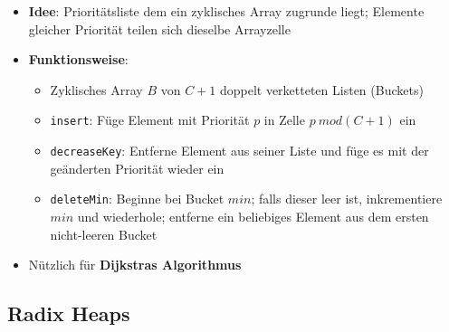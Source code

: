 \documentclass[10pt,a4paper]{article}
\begin{document}
  	\begin{itemize}
  		\item \textbf{Idee}: Prioritätsliste dem ein zyklisches Array zugrunde liegt; Elemente gleicher Priorität teilen sich dieselbe Arrayzelle
  		\item \textbf{Funktionsweise}:
  		\begin{itemize}
  			\item Zyklisches Array $B$ von $C + 1$ doppelt verketteten Listen (Buckets)
  			\item \texttt{insert}: Füge Element mit Priorität $p$ in Zelle $p\ mod (C + 1)$ ein
  			\item \texttt{decreaseKey}: Entferne Element aus seiner Liste und füge es mit der geänderten Priorität wieder ein
  			\item \texttt{deleteMin}: Beginne bei Bucket $min$; falls dieser leer ist, inkrementiere $min$ und wiederhole; entferne ein beliebiges Element aus dem ersten nicht-leeren Bucket
  		\end{itemize}
  		\item Nützlich für \textbf{Dijkstras Algorithmus}
  	\end{itemize}

  	\subsection{Radix Heaps}
  	\label{sub:radix_heaps}
  	
\end{document}
